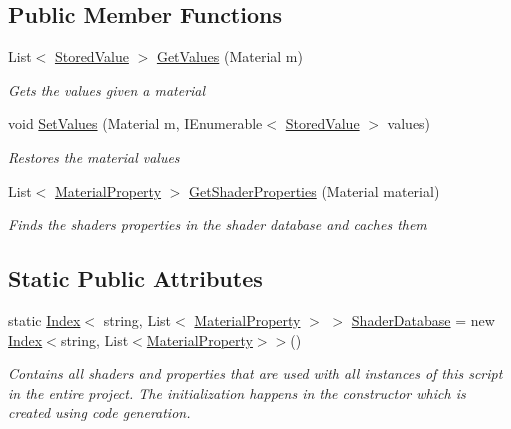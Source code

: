 \subsection*{Public Member Functions}
\begin{DoxyCompactItemize}
\item 
List$<$ \hyperlink{class_serialization_1_1_store_materials_1_1_stored_value}{Stored\+Value} $>$ \hyperlink{class_serialization_1_1_store_materials_a09c007367c6e8107eb78de40955fce71}{Get\+Values} (Material m)
\begin{DoxyCompactList}\small\item\em Gets the values given a material \end{DoxyCompactList}\item 
void \hyperlink{class_serialization_1_1_store_materials_aeff125c4b2f6d2e248ac34bcd2a533b1}{Set\+Values} (Material m, I\+Enumerable$<$ \hyperlink{class_serialization_1_1_store_materials_1_1_stored_value}{Stored\+Value} $>$ values)
\begin{DoxyCompactList}\small\item\em Restores the material values \end{DoxyCompactList}\item 
List$<$ \hyperlink{class_serialization_1_1_store_materials_1_1_material_property}{Material\+Property} $>$ \hyperlink{class_serialization_1_1_store_materials_a2914565dc84d7412884c11abb412c5ff}{Get\+Shader\+Properties} (Material material)
\begin{DoxyCompactList}\small\item\em Finds the shader\textquotesingle{}s properties in the shader database and caches them \end{DoxyCompactList}\end{DoxyCompactItemize}
\subsection*{Static Public Attributes}
\begin{DoxyCompactItemize}
\item 
static \hyperlink{class_index}{Index}$<$ string, List$<$ \hyperlink{class_serialization_1_1_store_materials_1_1_material_property}{Material\+Property} $>$ $>$ \hyperlink{class_serialization_1_1_store_materials_a2c506682608604ebb0e991f83162c99f}{Shader\+Database} = new \hyperlink{class_index}{Index}$<$string, List$<$\hyperlink{class_serialization_1_1_store_materials_1_1_material_property}{Material\+Property}$>$$>$()
\begin{DoxyCompactList}\small\item\em Contains all shaders and properties that are used with all instances of this script in the entire project. The initialization happens in the constructor which is created using code generation. \end{DoxyCompactList}\end{DoxyCompactItemize}
